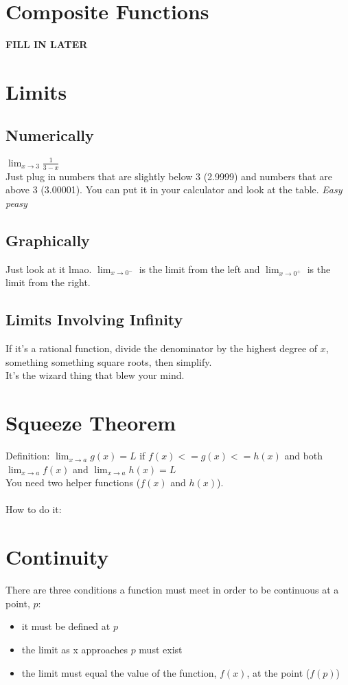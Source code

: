 \documentclass{article}
\begin{document}
\section{Composite Functions}
\textbf{FILL IN LATER}

\section{Limits}

\subsection{Numerically}
$\lim_{x \to 3} \frac{1}{3-x}$\\
Just plug in numbers that are slightly below 3 (2.9999) and numbers that are above 3 (3.00001). You can put it in your calculator and look at the table.\textit{ Easy peasy}

\subsection{Graphically}
Just look at it lmao. $\lim_{x \to 0^-}$ is the limit from the left and $\lim_{x \to 0^+}$ is the limit from the right.

\subsection{Limits Involving Infinity}
If it's a rational function, divide the denominator by the highest degree of $x$, something something square roots, then simplify.\\
It's the wizard thing that blew your mind.

\section{Squeeze Theorem}
Definition: $\lim_{x \to a} g(x) = L$ if $f(x) <= g(x) <= h(x)$  and both $\lim_{x \to a} f(x)$ and $\lim_{x \to a} h(x) = L$\\
You need two helper functions ($f(x)$ and $h(x)$).\\
\\
How to do it:

\section{Continuity}
There are three conditions a function must meet in order to be continuous at a point, $p$:
\begin{itemize}
\item it must be defined at $p$
\item the limit as x approaches $p$ must exist
\item the limit must equal the value of the function, $f(x)$, at the point ($f(p)$)
\end{itemize}
\end{document}
